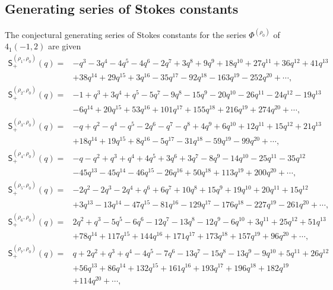 \documentclass[pdftex]{sigma}
\numberwithin{equation}{section}
\begin{document}
\subsection{Generating series of Stokes constants}\label{app:stokes}

The conjectural generating series of Stokes constants for the series $\Phi^{(\rho_{0})}$ of $4_1(-1,2)$ are given
\begin{align*}
\mathsf{S}_{+}^{(\rho_{1},\rho_{0})}(q)
 ={}&-q^3 - 3q^4 - 4q^5 - 4q^6 - 2q^7 + 3q^8 + 9q^9 + 18q^{10} + 27q^{11} + 36q^{12} + 41q^{13}\\
& + 38q^{14} + 29q^{15} + 3q^{16} - 35q^{17} - 92q^{18} - 163q^{19} - 252q^{20} + \cdots , \\
\mathsf{S}_{+}^{(\rho_{2},\rho_{0})}(q)
 ={}&-1 + q^3 + 3q^4 + q^5 - 5q^7 - 9q^8 - 15q^9 - 20q^{10} - 26q^{11} - 24q^{12} - 19q^{13}\\
&  - 6q^{14} + 20q^{15} + 53q^{16} + 101q^{17} + 155q^{18} + 216q^{19} + 274q^{20} + \cdots , \\
\mathsf{S}_{+}^{(\rho_{3},\rho_{0})}(q)
 ={}&-q + q^2 - q^4 - q^5 - 2q^6 - q^7 - q^8 + 4q^9 + 6q^{10} + 12q^{11} + 15q^{12} + 21q^{13}\\
&  + 18q^{14} + 19q^{15} + 8q^{16} - 5q^{17} - 31q^{18} - 59q^{19} - 99q^{20} + \cdots , \\
\mathsf{S}_{+}^{(\rho_{4},\rho_{0})}(q)
 ={}&-q - q^2 + q^3 + q^4 + 4q^5 + 3q^6 + 3q^7 - 8q^9 - 14q^{10} - 25q^{11} - 35q^{12}\\
& - 45q^{13} - 45q^{14} - 46q^{15} - 26q^{16} + 50q^{18} + 113q^{19} + 200q^{20} + \cdots , \\
\mathsf{S}_{+}^{(\rho_{5},\rho_{0})}(q)
 ={}&-2q^2 - 2q^3 - 2q^4 + q^6 + 6q^7 + 10q^8 + 15q^9 + 19q^{10} + 20q^{11} + 15q^{12}\\
&  + 3q^{13}- 13q^{14} - 47q^{15} - 81q^{16} - 129q^{17} - 176q^{18} - 227q^{19} - 261q^{20} + \cdots , \\
\mathsf{S}_{+}^{(\rho_{6},\rho_{0})}(q)
 ={}&2q^2 + q^3 - 5q^5 - 6q^6 - 12q^7 - 13q^8 - 12q^9 - 6q^{10} + 3q^{11} + 25q^{12} + 51q^{13}\\
& + 78q^{14} + 117q^{15} + 144q^{16} + 171q^{17} + 173q^{18} + 157q^{19} + 96q^{20} + \cdots , \\
\mathsf{S}_{+}^{(\rho_{7},\rho_{0})}(q)
 ={}&q + 2q^2 + q^3 + q^4 - 4q^5 - 7q^6 - 13q^7 - 15q^8 - 13q^9 - 9q^{10} + 5q^{11} + 26q^{12}\\
& + 56q^{13} + 86q^{14} + 132q^{15} + 161q^{16} + 193q^{17} + 196q^{18} + 182q^{19} \\
& + 114q^{20} + \cdots ,
\end{align*}
\end{document}
